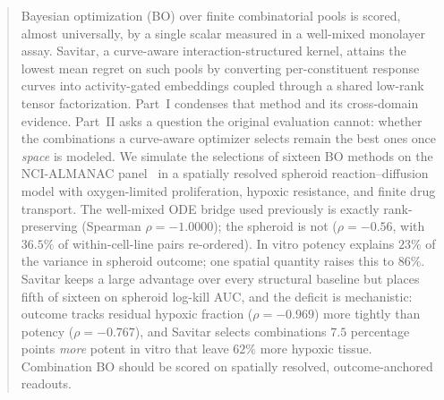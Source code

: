 \documentclass{article}
\begin{document}
\makeatletter
\let\ps@icmlorig\ps@fancy
\makeatother




\begin{abstract}
Bayesian optimization (BO) over finite combinatorial pools is scored, almost
universally, by a single scalar measured in a well-mixed monolayer assay.
Savitar, a curve-aware interaction-structured kernel, attains the lowest mean
regret on such pools by converting per-constituent response curves into
activity-gated embeddings coupled through a shared low-rank tensor
factorization. Part~I condenses that method and its cross-domain evidence.
Part~II asks a question the original evaluation cannot: whether the
combinations a curve-aware optimizer selects remain the best ones once
\emph{space} is modeled. We simulate the selections of sixteen BO methods on
the NCI-ALMANAC panel~\citep{holbeck2017} in a spatially resolved spheroid
reaction--diffusion model with oxygen-limited proliferation, hypoxic
resistance, and finite drug transport. The well-mixed ODE bridge used
previously is exactly rank-preserving (Spearman $\rho = -1.0000$); the
spheroid is not ($\rho = -0.56$, with $36.5\%$ of within-cell-line pairs
re-ordered). In vitro potency explains $23\%$ of the variance in spheroid
outcome; one spatial quantity raises this to $86\%$. Savitar keeps a large
advantage over every structural baseline but places fifth of sixteen on
spheroid log-kill AUC, and the deficit is mechanistic: outcome tracks
residual hypoxic fraction ($\rho = -0.969$) more tightly than potency
($\rho = -0.767$), and Savitar selects combinations $7.5$ percentage points
\emph{more} potent in vitro that leave $62\%$ more hypoxic tissue.
Combination BO should be scored on spatially resolved, outcome-anchored
readouts.
\end{abstract}
\end{document}
